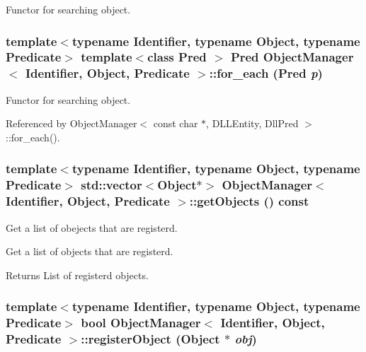 Functor for searching object. 

\subsubsection[{for\_\-each}]{\setlength{\rightskip}{0pt plus 5cm}template$<$typename Identifier, typename Object, typename Predicate$>$ template$<$class Pred $>$ Pred {\bf ObjectManager}$<$ Identifier, Object, Predicate $>$::for\_\-each (Pred {\em p})\hspace{0.3cm}{\ttfamily  [inline]}}\label{classObjectManager_a179e86f4b3548f17ac88ac2e2679d541}


Functor for searching object. 



Referenced by ObjectManager$<$ const char $\ast$, DLLEntity, DllPred $>$::for\_\-each().

\subsubsection[{getObjects}]{\setlength{\rightskip}{0pt plus 5cm}template$<$typename Identifier, typename Object, typename Predicate$>$ std::vector$<$Object$\ast$$>$ {\bf ObjectManager}$<$ Identifier, Object, Predicate $>$::getObjects () const\hspace{0.3cm}{\ttfamily  [inline]}}\label{classObjectManager_ab60972d0240a0a1098ed5cec63f0fca2}


Get a list of obejects that are registerd. 

Get a list of objects that are registerd.

\begin{DoxyReturn}{Returns}
List of registerd objects. 
\end{DoxyReturn}
\subsubsection[{registerObject}]{\setlength{\rightskip}{0pt plus 5cm}template$<$typename Identifier, typename Object, typename Predicate$>$ bool {\bf ObjectManager}$<$ Identifier, Object, Predicate $>$::registerObject (Object $\ast$ {\em obj})\hspace{0.3cm}{\ttfamily  [inline]}}\label{classObjectManager_a43de06b277f07a24088b46f640de8221}


